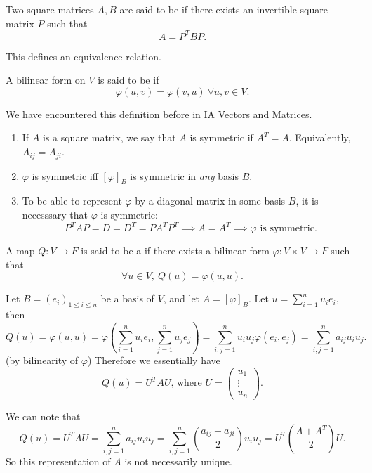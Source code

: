 \documentclass[a4paper]{scrartcl}
\begin{document}
\begin{definition}
     Two square matrices $A,B$ are said to be  if there exists an invertible square matrix $P$ such that 
     \[A=P^T B P.\]
\end{definition}
\begin{remark}
     This defines an equivalence relation.
\end{remark}
\begin{definition}
     A bilinear form on $V$ is said to be  if 
     \[\varphi(u,v)=\varphi(v,u) \ \forall u,v \in V.\]
\end{definition}
\begin{remark}
     We have encountered this definition before in IA Vectors and Matrices.
    \begin{enumerate}
        \item If $A$ is a square matrix, we say that $A$ is symmetric if $A^T=A$. Equivalently, $A_{ij}=A_{ji}$.
        \item $\varphi$ is symmetric iff $[\varphi]_B$ is symmetric in \emph{any} basis $B$.
        \item To be able to represent $\varphi$ by a diagonal matrix in some basis $B$, it is necesssary that $\varphi$ is symmetric: 
        \[P^T AP=D=D^T=P A^T P^T \implies A=A^T \implies \varphi \text{ is symmetric} .\]    
    \end{enumerate}
     
\end{remark}
\begin{definition}
     A map $Q: V \rightarrow F$ is said to be a  if there exists a bilinear form $\varphi: V \times V \rightarrow F$ such that 
     \[\forall u \in V, \ Q(u)=\varphi (u,u).\]
\end{definition}
\begin{remark}
     Let $B=(e_i)_{1 \leq i \leq n}$ be a basis of $V$, and let $A=[\varphi]_B$. Let $u=\sum_{i=1}^{n}u_i e_i$, then 
     \[Q (u)=\varphi (u,u)=\varphi \left(\sum_{i=1}^{n}u_i e_i, \sum_{j=1}^{n}u_j e_j\right)=\sum_{i,j=1}^{n}u_i u_j \varphi(e_i,e_j)=\sum_{i,j=1}^{n}a_{ij} u_i u_j.\]
     (by bilinearity of $\varphi$)
     Therefore we essentially have 
     \[Q (u)=U^T A U \text{, where } U=\begin{pmatrix}
     u_1\\\vdots \\ u_n
     \end{pmatrix}
     .\]
\end{remark}
\begin{remark}
     We can note that 
     \[Q (u)=U^T A U =\sum_{i,j=1}^{n}a_{ij}u_i u_j=\sum_{i,j=1}^{n}(\frac{a_{ij}+a_{ji}}{2})u_i u_j=U^T (\frac{A+A^T}{2}) U.\]
     So this representation of $A$ is not necessarily unique.
\end{remark}
\end{document}
